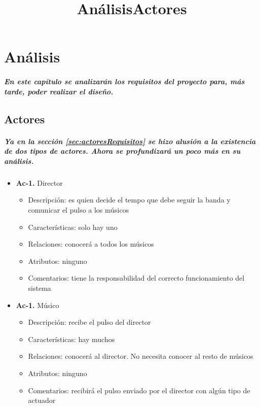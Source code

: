 \chapter{Análisis}
\title{Análisis}
\label{cap:Analisis}

\paragraph{
En este capítulo se analizarán los requisitos del proyecto para, más tarde, poder
realizar el diseño.
}

\title{Actores}
\section{Actores}
\paragraph{
Ya en la sección \ref{sec:actoresRequisitos} se hizo alusión a la existencia de
dos tipos de actores. Ahora se profundizará un poco más en su análisis.
}

\begin{itemize}
  \item \textbf{Ac-1.} Director
  \begin{itemize}
   \item Descripción: es quien decide el tempo que debe seguir la banda y comunicar el pulso
   a los músicos
   \item Características: solo hay uno
   \item Relaciones: conocerá a todos los músicos
   \item Atributos: ninguno
   \item Comentarios: tiene la responsabilidad del correcto funcionamiento del sistema
  \end{itemize}

  \item \textbf{Ac-1.} Músico
  \begin{itemize}
     \item Descripción: recibe el pulso del director
     \item Características: hay muchos
     \item Relaciones: conocerá al director. No necesita conocer al resto de músicos
     \item Atributos: ninguno
     \item Comentarios: recibirá el pulso enviado por el director con algún tipo de actuador
  \end{itemize}
\end{itemize}

